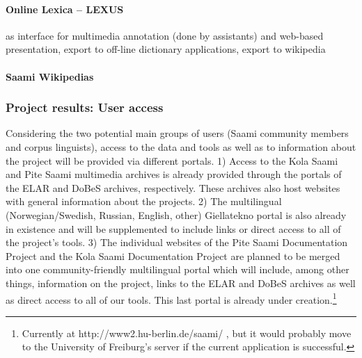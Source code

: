 \documentclass[a4paper,12pt]{article}
\begin{document}
\paragraph{Online Lexica – LEXUS}%
 as interface for multimedia annotation (done by assistants) and web-based presentation, export to off-line dictionary applications, export to wikipedia %

\paragraph{Saami Wikipedias}%

\subsubsection{Project results: User access}\label{projectResult3}
Considering the two potential main groups of users (Saami community members and corpus linguists), access to the data and tools as well as to information about the project will be provided via different portals. 1) Access to the Kola Saami and Pite Saami multimedia archives is already provided through the portals of the ELAR and DoBeS archives, respectively. These archives also host websites with general information about the projects. 2) The multilingual (Norwegian/Swedish, Russian, English, other) Giellatekno portal is also already in existence and will be supplemented to include links or direct access to all of the project's tools. 3) The individual websites of the Pite Saami Documentation Project and the Kola Saami Documentation Project are planned to be merged into one community-friendly multilingual portal which will include, among other things, information on the project, links to the ELAR and DoBeS archives as well as direct access to all of our tools. This last portal is already under creation.\footnote{Currently at http://www2.hu-berlin.de/saami/%
, but it would probably move to the University of Freiburg's server if the current application is successful.}
\end{document}
